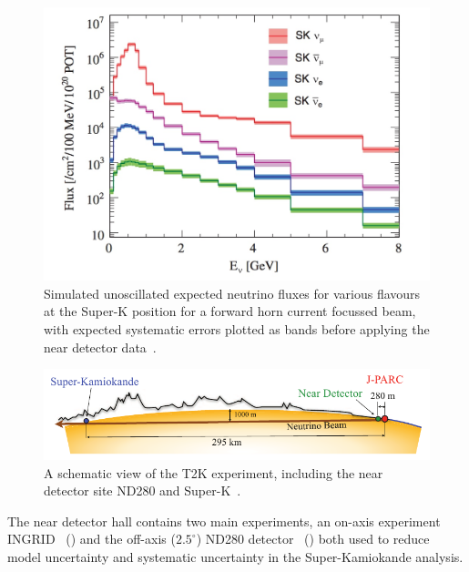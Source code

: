 \begin{figure}[h!]
\centering
  \centering
\includegraphics[width=\textwidth]{figures/ND280Flux.jpeg}
\vspace{2mm}
\caption{Simulated unoscillated expected neutrino fluxes for various flavours at the Super-K position for a forward horn current focussed beam, with expected systematic errors plotted as bands before applying the near detector data~\cite{21T2K}.}
\label{fig:ND280Flux}
\end{figure}

\begin{figure}[h!]
\centering
  \centering
\includegraphics[width=\textwidth]{figures/T2KBeam.png}
\vspace{2mm}
\caption{A schematic view of the T2K experiment, including the near detector site ND280 and Super-K~\cite{21T2K}.}
\label{fig:T2K}
\end{figure}

The near detector hall contains two main experiments, an on-axis experiment INGRID~\cite{129INGRID} () and the off-axis ($2.5^\circ$) ND280 detector~\cite{130Assylbekov} () both used to reduce model uncertainty and systematic uncertainty in the Super-Kamiokande analysis. %

